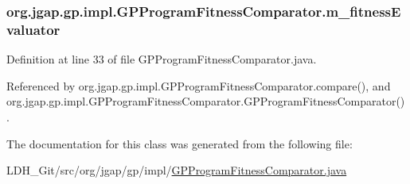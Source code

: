 \hypertarget{classorg_1_1jgap_1_1gp_1_1impl_1_1_g_p_program_fitness_comparator_ac1ea9f31ce9be111529e158f7060d9cb}{
\subsubsection[{m\-\_\-fitness\-Evaluator}]{ org.\-jgap.\-gp.\-impl.\-G\-P\-Program\-Fitness\-Comparator.\-m\-\_\-fitness\-Evaluator\hspace{0.3cm}{\ttfamily [private]}}}\label{classorg_1_1jgap_1_1gp_1_1impl_1_1_g_p_program_fitness_comparator_ac1ea9f31ce9be111529e158f7060d9cb}


Definition at line 33 of file G\-P\-Program\-Fitness\-Comparator.\-java.



Referenced by org.\-jgap.\-gp.\-impl.\-G\-P\-Program\-Fitness\-Comparator.\-compare(), and org.\-jgap.\-gp.\-impl.\-G\-P\-Program\-Fitness\-Comparator.\-G\-P\-Program\-Fitness\-Comparator().



The documentation for this class was generated from the following file\-:\begin{DoxyCompactItemize}
\item 
L\-D\-H\-\_\-\-Git/src/org/jgap/gp/impl/\hyperlink{_g_p_program_fitness_comparator_8java}{G\-P\-Program\-Fitness\-Comparator.\-java}\end{DoxyCompactItemize}
